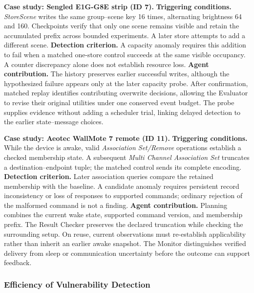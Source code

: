 \documentclass[10pt,journal,compsoc]{IEEEtran}
\newcommand{\parab}[1]{\vspace{0.04in}\noindent\textbf{#1}}
\begin{document}
\parab{Case study: Sengled E1G-G8E strip (ID 7).}
\textbf{Triggering conditions.} \emph{StoreScene} writes the same group--scene key 16 times, alternating brightness 64 and 160. Checkpoints verify that only one scene remains visible and retain the accumulated prefix across bounded experiments. A later store attempts to add a different scene. \textbf{Detection criterion.} A capacity anomaly requires this addition to fail when a matched one-store control succeeds at the same visible occupancy. A counter discrepancy alone does not establish resource loss. \textbf{Agent contribution.} The history preserves earlier successful writes, although the hypothesized failure appears only at the later capacity probe. After confirmation, matched replay identifies contributing overwrite decisions, allowing the Evaluator to revise their original utilities under one conserved event budget. The probe supplies evidence without adding a scheduler trial, linking delayed detection to the earlier state--message choices.

\parab{Case study: Aeotec WallMote 7 remote (ID 11).}
\textbf{Triggering conditions.} While the device is awake, valid \emph{Association Set/Remove} operations establish a checked membership state. A subsequent \emph{Multi Channel Association Set} truncates a destination--endpoint tuple; the matched control sends its complete encoding. \textbf{Detection criterion.} Later association queries compare the retained membership with the baseline. A candidate anomaly requires persistent record inconsistency or loss of responses to supported commands; ordinary rejection of the malformed command is not a finding. \textbf{Agent contribution.} Planning combines the current wake state, supported command version, and membership prefix. The Result Checker preserves the declared truncation while checking the surrounding setup. On reuse, current observations must re-establish applicability rather than inherit an earlier awake snapshot. The Monitor distinguishes verified delivery from sleep or communication uncertainty before the outcome can support feedback.

\subsubsection{Efficiency of Vulnerability Detection}
\end{document}
